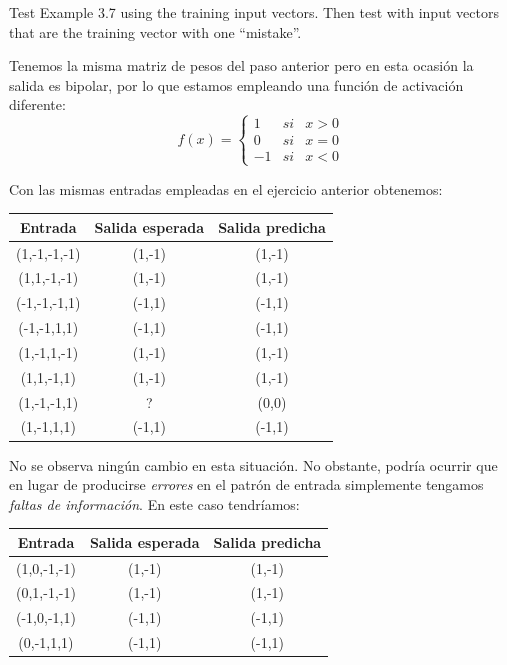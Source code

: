 \begin{problem}[5]
Test Example 3.7 using the training input vectors. Then test with input vectors that
are the training vector with one ``mistake''.
\solution
{}

Tenemos la misma matriz de pesos del paso anterior pero en esta ocasión la salida es bipolar, por lo que estamos empleando una función de activación diferente:
\[f(x) = \left\{ \begin{array}{lll} 1 & si & x>0 \\ 0 & si & x=0 \\ -1 & si & x< 0 \end{array}\right. \]

Con las mismas entradas empleadas en el ejercicio anterior obtenemos:
\begin{center}
\begin{tabular}{|c|c|c|}
\hline
\textbf{Entrada } & \textbf{Salida esperada} & \textbf{Salida predicha} \\
\hline
(1,-1,-1,-1) & (1,-1) & (1,-1) \\
(1,1,-1,-1)  & (1,-1) & (1,-1) \\
(-1,-1,-1,1) & (-1,1) & (-1,1) \\
(-1,-1,1,1)  & (-1,1) & (-1,1) \\
(1,-1,1,-1)  & (1,-1) & (1,-1) \\
(1,1,-1,1)   & (1,-1) & (1,-1) \\
(1,-1,-1,1)  & ?      & (0,0)  \\
(1,-1,1,1)   & (-1,1) & (-1,1) \\
\hline
\end{tabular}
\end{center}

No se observa ningún cambio en esta situación. No obstante, podría ocurrir que en lugar de producirse \emph{errores} en el patrón de entrada simplemente tengamos \emph{faltas de información}. En este caso tendríamos:
\begin{center}
\begin{tabular}{|c|c|c|}
\hline
\textbf{Entrada } & \textbf{Salida esperada} & \textbf{Salida predicha} \\
\hline
(1,0,-1,-1) & (1,-1)  & (1,-1) \\
(0,1,-1,-1)  & (1,-1) & (1,-1) \\
(-1,0,-1,1) & (-1,1)  & (-1,1) \\
(0,-1,1,1)  & (-1,1)  & (-1,1) \\
\hline
\end{tabular}
\end{center}
\end{problem}

